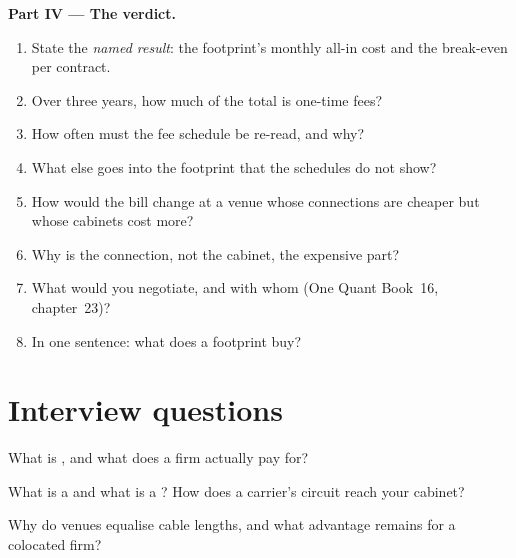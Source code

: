 \begin{problem}
\medskip\noindent\textbf{Part IV --- The verdict.}
\begin{enumerate}[resume]
\item State the \emph{named result}: the footprint's monthly all-in cost and the break-even per contract.
\item Over three years, how much of the total is one-time fees?
\item How often must the fee schedule be re-read, and why?
\item What else goes into the footprint that the schedules do not show?
\item How would the bill change at a venue whose connections are cheaper but whose cabinets cost more?
\item Why is the connection, not the cabinet, the expensive part?
\item What would you negotiate, and with whom (One Quant Book~16, chapter~23)?
\item In one sentence: what does a  footprint buy?
\end{enumerate}
\end{problem}

\section{Interview questions}

\begin{interviewq}\label{iq:nw:colocation-products-and-how-they-are-sold:1}
What is , and what does a firm actually pay for?
\end{interviewq}

\begin{interviewq}\label{iq:nw:colocation-products-and-how-they-are-sold:2}
What is a  and what is a ? How does a carrier's circuit reach your cabinet?
\end{interviewq}

\begin{interviewq}\label{iq:nw:colocation-products-and-how-they-are-sold:3}
Why do venues equalise cable lengths, and what advantage remains for a colocated firm?
\end{interviewq}

